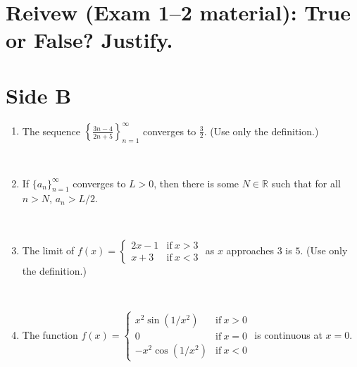 \documentclass[12pt]{amsart}
\newcommand{\R}{{\mathbb{R}}}
\numberwithin{equation}{section}
\theoremstyle{plain} %
\theoremstyle{definition}
\theoremstyle{remark}
\newcommand{\ds}{\displaystyle}
\begin{document}
\newpage



\section*{\large Reivew (Exam 1--2 material): True or False? Justify.}

\section*{Side B}








\begin{enumerate}








\item The sequence $\ds \left\{ \frac{3n-4}{2n+5}\right\}_{n=1}^\infty$ converges to $\frac{3}{2}$. (Use only the definition.)

\

\item If $\{a_n\}_{n=1}^\infty$ converges to $L>0$, then there is some $N\in \R$ such that for all $n>N$, $a_n > L/2$.

\

\item The limit of $f(x)=\begin{cases} 2x-1 & \text{if} \ x>3 \\ x+3 & \text{if} \ x<3 \end{cases}$ as $x$ approaches $3$ is $5$. (Use only the definition.)


\

\item The function $f(x) = \begin{cases} x^2 \sin(1/x^2)  & \text{if} \ x>0 \\ 
0 & \text{if} \ x=0 \\ -x^2 \cos(1/x^2)  & \text{if} \ x<0\end{cases}$ is continuous at $x=0$.

\


\end{enumerate}
\end{document}
